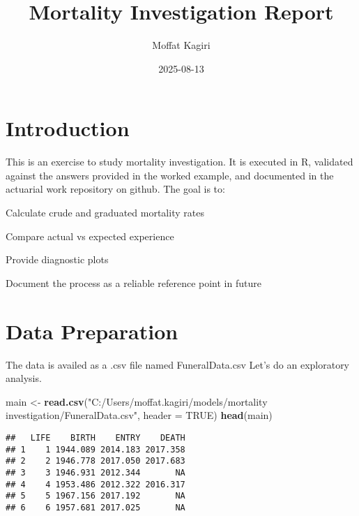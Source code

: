 \documentclass[
]{article}
\title{Mortality Investigation Report}
\author{Moffat Kagiri}
\date{2025-08-13}
\newenvironment{Shaded}{\begin{snugshade}}{\end{snugshade}}
\newcommand{\AttributeTok}[1]{\textcolor[rgb]{0.13,0.29,0.53}{#1}}
\newcommand{\ConstantTok}[1]{\textcolor[rgb]{0.56,0.35,0.01}{#1}}
\newcommand{\FunctionTok}[1]{\textcolor[rgb]{0.13,0.29,0.53}{\textbf{#1}}}
\newcommand{\NormalTok}[1]{#1}
\newcommand{\OtherTok}[1]{\textcolor[rgb]{0.56,0.35,0.01}{#1}}
\newcommand{\StringTok}[1]{\textcolor[rgb]{0.31,0.60,0.02}{#1}}
\begin{document}
\maketitle

\section{Introduction}\label{introduction}

This is an exercise to study mortality investigation. It is executed in
R, validated against the answers provided in the worked example, and
documented in the actuarial work repository on github. The goal is to:

\item

Calculate crude and graduated mortality rates

\item

Compare actual vs expected experience

\item

Provide diagnostic plots

\item

Document the process as a reliable reference point in future

\section{Data Preparation}\label{data-preparation}

The data is availed as a .csv file named FuneralData.csv Let's do an
exploratory analysis.

\begin{Shaded}
\begin{Highlighting}[]
\NormalTok{main }\OtherTok{\textless{}{-}} \FunctionTok{read.csv}\NormalTok{(}\StringTok{"C:/Users/moffat.kagiri/models/mortality investigation/FuneralData.csv"}\NormalTok{, }\AttributeTok{header =} \ConstantTok{TRUE}\NormalTok{)}
\FunctionTok{head}\NormalTok{(main)}
\end{Highlighting}
\end{Shaded}

\begin{verbatim}
##   LIFE    BIRTH    ENTRY    DEATH
## 1    1 1944.089 2014.183 2017.358
## 2    2 1946.778 2017.050 2017.683
## 3    3 1946.931 2012.344       NA
## 4    4 1953.486 2012.322 2016.317
## 5    5 1967.156 2017.192       NA
## 6    6 1957.681 2017.025       NA
\end{verbatim}
\end{document}
